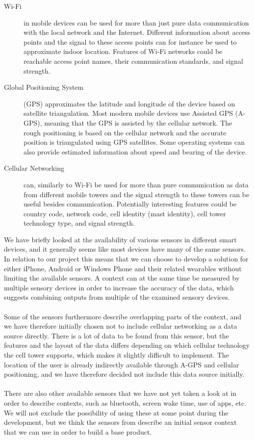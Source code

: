\begin{description}
    \item[Wi-Fi] in mobile devices can be used for more than just pure data communication with the local network and the Internet. Different information about access points and the signal to these access points can for instance be used to approximate indoor location. Features of Wi-Fi networks could be reachable access point names, their communication standards, and signal strength. 
    \item[Global Positioning System] (GPS) approximates the latitude and longitude of the device based on satellite triangulation. Most modern mobile devices use Assisted GPS (A-GPS), meaning that the GPS is assisted by the cellular network. The rough positioning is based on the cellular network and the accurate position is triangulated using GPS satellites. Some operating systems can also provide estimated information about speed and bearing of the device.
    \item[Cellular Networking] can, similarly to Wi-Fi be used for more than pure communication as data from different mobile towers and the signal strength to these towers can be useful besides communication. Potentially interesting features could be country code, network code, cell identity (mast identity), cell tower technology type, and signal strength.
\end{description}

We have briefly looked at the availability of various sensors in different smart devices, and it generally seems like most devices have many of the same sensors. In relation to our project this means that we can choose to develop a solution for either iPhone, Android or Windows Phone and their related wearables without limiting the available sensors. A context can at the same time be measured by multiple sensory devices in order to increase the accuracy of the data, which suggests combining outputs from multiple of the examined sensory devices. 
\\\\
Some of the sensors furthermore describe overlapping parts of the context, and we have therefore initially chosen not to include cellular networking as a data source directly. There is a lot of data to be found from this sensor, but the features and the layout of the data differs depending on which cellular technology the cell tower supports, which makes it slightly difficult to implement. The location of the user is already indirectly available through A-GPS and cellular positioning, and we have therefore decided not include this data source initially. 
\\\\
There are also other available sensors that we have not yet taken a look at in order to describe contexts, such as bluetooth, screen wake time, use of apps, etc. We will not exclude the possibility of using these at some point during the development, but we think the sensors from  describe an initial sensor context that we can use in order to build a base product. 